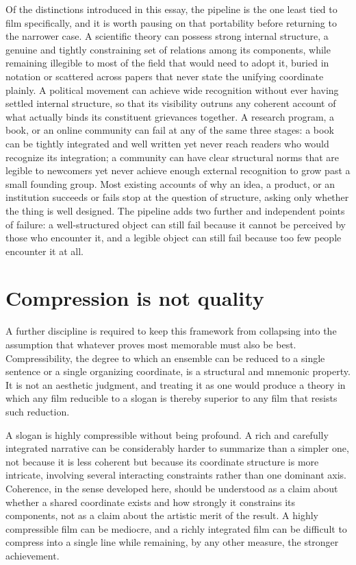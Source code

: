 \documentclass[11pt]{article}
\begin{document}
Of the distinctions introduced in this essay, the pipeline is the one least tied to film specifically, and it is worth pausing on that portability before returning to the narrower case. A scientific theory can possess strong internal structure, a genuine and tightly constraining set of relations among its components, while remaining illegible to most of the field that would need to adopt it, buried in notation or scattered across papers that never state the unifying coordinate plainly. A political movement can achieve wide recognition without ever having settled internal structure, so that its visibility outruns any coherent account of what actually binds its constituent grievances together. A research program, a book, or an online community can fail at any of the same three stages: a book can be tightly integrated and well written yet never reach readers who would recognize its integration; a community can have clear structural norms that are legible to newcomers yet never achieve enough external recognition to grow past a small founding group. Most existing accounts of why an idea, a product, or an institution succeeds or fails stop at the question of structure, asking only whether the thing is well designed. The pipeline adds two further and independent points of failure: a well-structured object can still fail because it cannot be perceived by those who encounter it, and a legible object can still fail because too few people encounter it at all.

\section{Compression is not quality}

A further discipline is required to keep this framework from collapsing into the assumption that whatever proves most memorable must also be best. Compressibility, the degree to which an ensemble can be reduced to a single sentence or a single organizing coordinate, is a structural and mnemonic property. It is not an aesthetic judgment, and treating it as one would produce a theory in which any film reducible to a slogan is thereby superior to any film that resists such reduction.

A slogan is highly compressible without being profound. A rich and carefully integrated narrative can be considerably harder to summarize than a simpler one, not because it is less coherent but because its coordinate structure is more intricate, involving several interacting constraints rather than one dominant axis. Coherence, in the sense developed here, should be understood as a claim about whether a shared coordinate exists and how strongly it constrains its components, not as a claim about the artistic merit of the result. A highly compressible film can be mediocre, and a richly integrated film can be difficult to compress into a single line while remaining, by any other measure, the stronger achievement.
\end{document}
